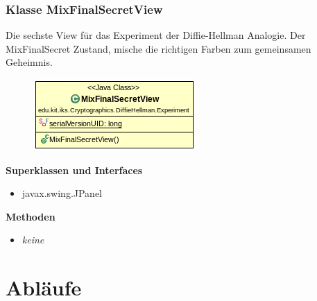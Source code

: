 \documentclass{article}
\begin{document}
\subsubsection{Klasse MixFinalSecretView}
      Die sechste View für das Experiment der Diffie-Hellman Analogie.
      Der MixFinalSecret Zustand, mische die richtigen Farben
      zum gemeinsamen Geheimnis.

      \begin{figure}[H]
        \centering
        \includegraphics{resources/edu-kit-iks-Cryptographics-DiffieHellman-Experiment-MixFinalSecretView}
      \end{figure}

      \textbf{Superklassen und Interfaces}
      \begin{itemize}
        \item javax.swing.JPanel
      \end{itemize}

      \textbf{Methoden}
      \begin{itemize}
        \item \textit{keine}
      \end{itemize}

\section{Abläufe}

\glsaddall
\printglossary[numberedsection, style=altlist]
\end{document}
